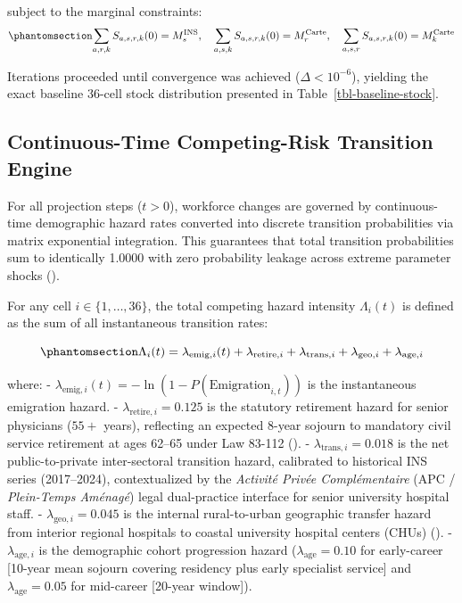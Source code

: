 \documentclass[
  11pt,
  a4paper]{article}
\begin{document}
subject to the marginal constraints:
\begin{equation}\protect\phantomsection\label{eq-ipf-constraints}{\sum_{a,r,k} S_{a,s,r,k}(0) = M_s^{\text{INS}}, \quad \sum_{a,s,k} S_{a,s,r,k}(0) = M_r^{\text{Carte}}, \quad \sum_{a,s,r} S_{a,s,r,k}(0) = M_k^{\text{Carte}}}\end{equation}

Iterations proceeded until convergence was achieved
(\(\Delta < 10^{-6}\)), yielding the exact baseline 36-cell stock
distribution presented in Table~\ref{tbl-baseline-stock}.

\subsection{Continuous-Time Competing-Risk Transition
Engine}\label{sec-methods-engine}

For all projection steps (\(t > 0\)), workforce changes are governed by
continuous-time demographic hazard rates converted into discrete
transition probabilities via matrix exponential integration. This
guarantees that total transition probabilities sum to identically 1.0000
with zero probability leakage across extreme parameter shocks
().

For any cell \(i \in \{1, \dots, 36\}\), the total competing hazard
intensity \(\Lambda_i(t)\) is defined as the sum of all instantaneous
transition rates:

\begin{equation}\protect\phantomsection\label{eq-hazard-sum}{\Lambda_i(t) = \lambda_{\text{emig}, i}(t) + \lambda_{\text{retire}, i} + \lambda_{\text{trans}, i} + \lambda_{\text{geo}, i} + \lambda_{\text{age}, i}}\end{equation}

where: -
\(\lambda_{\text{emig}, i}(t) = -\ln(1 - P(\text{Emigration}_{i,t}))\)
is the instantaneous emigration hazard. -
\(\lambda_{\text{retire}, i} = 0.125\) is the statutory retirement
hazard for senior physicians (\(55+\) years), reflecting an expected
8-year sojourn to mandatory civil service retirement at ages 62--65
under Law 83-112 (). - \(\lambda_{\text{trans}, i} = 0.018\) is the net
public-to-private inter-sectoral transition hazard, calibrated to
historical INS series (2017--2024), contextualized by the \emph{Activité
Privée Complémentaire} (APC / \emph{Plein-Temps Aménagé}) legal
dual-practice interface for senior university hospital staff. -
\(\lambda_{\text{geo}, i} = 0.045\) is the internal rural-to-urban
geographic transfer hazard from interior regional hospitals to coastal
university hospital centers (CHUs) (). - \(\lambda_{\text{age}, i}\) is
the demographic cohort progression hazard
(\(\lambda_{\text{age}} = 0.10\) for early-career {[}10-year mean
sojourn covering residency plus early specialist service{]} and
\(\lambda_{\text{age}} = 0.05\) for mid-career {[}20-year window{]}).
\end{document}
